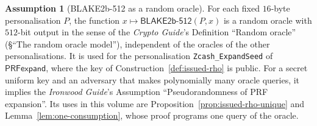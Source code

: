 \documentclass[11pt,a4paper]{article}
\theoremstyle{definition}
\newtheorem{assumption}[theorem]{Assumption}
\begin{document}
\begin{assumption}[BLAKE2b-512 as a random oracle]\label{ass:blake2b512-ro}
For each fixed $16$-byte personalisation $P$, the function
$x \mapsto \mathsf{BLAKE2b\text{-}512}(P, x)$ is a random oracle with
$512$-bit output in the sense of the \emph{Crypto Guide}'s Definition
``Random oracle'' (\S``The random oracle model''), independent of the
oracles of the other personalisations. It is used for the personalisation
\texttt{Zcash\_ExpandSeed} of $\mathsf{PRFexpand}$, where the key of
Construction~\ref{def:issued-rho} is public. For a secret uniform key and
an adversary that makes polynomially many oracle queries, it implies the
\emph{Ironwood Guide}'s Assumption ``Pseudorandomness of PRF expansion''.
Its uses in this volume are Proposition~\ref{prop:issued-rho-unique} and
Lemma~\ref{lem:one-consumption}, whose proof programs one query of the
oracle.
\end{assumption}
\end{document}
